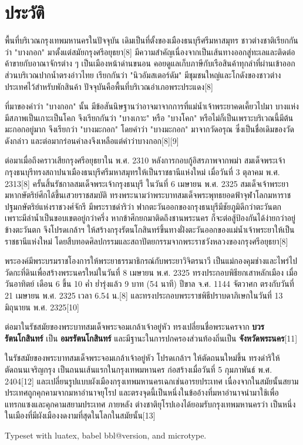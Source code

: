 \documentclass[twocolumn]{article}
\begin{document}
\section{ประวัติ}

พื้นที่บริเวณกรุงเทพมหานครในปัจจุบัน เดิมเป็นที่ตั้งของเมืองธนบุรีศรีมหาสมุทร ชาวต่างชาติเรียกกันว่า "บางกอก" มาตั้งแต่สมัยกรุงศรีอยุธยา[8] มีความสำคัญเนื่องจากเป็นเส้นทางออกสู่ทะเลและติดต่อค้าขายกับอาณาจักรต่าง ๆ เป็นเมืองหน้าด่านขนอน คอยดูแลเก็บภาษีกับเรือสินค้าทุกลำที่ผ่านเข้าออก ส่วนบริเวณปากน้ำตรงอ่าวไทย เรียกกันว่า "นิวอัมสเตอร์ดัม" มีชุมชนใหญ่และโกดังของชาวต่างประเทศไว้สำหรับพักสินค้า ปัจจุบันคือพื้นที่บริเวณอำเภอพระประแดง[8]

ที่มาของคำว่า "บางกอก" นั้น มีข้อสันนิษฐานว่าอาจมาจากการที่แม่น้ำเจ้าพระยาคดเคี้ยวไปมา บางแห่งมีสภาพเป็นเกาะเป็นโคก จึงเรียกกันว่า "บางเกาะ" หรือ "บางโคก" หรือไม่ก็เป็นเพราะบริเวณนี้มีต้นมะกอกอยู่มาก จึงเรียกว่า "บางมะกอก" โดยคำว่า "บางมะกอก" มาจากวัดอรุณ ซึ่งเป็นชื่อเดิมของวัดดังกล่าว และต่อมากร่อนคำลงจึงเหลือแต่คำว่าบางกอก[8][9]

ต่อมาเมื่อถึงคราวเสียกรุงศรีอยุธยาใน พ.ศ. 2310 หลังการกอบกู้อิสรภาพจากพม่า สมเด็จพระเจ้ากรุงธนบุรีทรงสถาปนาเมืองธนบุรีศรีมหาสมุทรให้เป็นราชธานีแห่งใหม่ เมื่อวันที่ 3 ตุลาคม พ.ศ. 2313[8] ครั้นสิ้นรัชกาลสมเด็จพระเจ้ากรุงธนบุรี ในวันที่ 6 เมษายน พ.ศ. 2325 สมเด็จเจ้าพระยามหากษัตริย์ศึกได้ขึ้นเสวยราชสมบัติ ทรงพระนามว่าพระบาทสมเด็จพระพุทธยอดฟ้าจุฬาโลกมหาราช ปฐมกษัตริย์แห่งราชวงศ์จักรี มีพระราชดำริว่า ฟากตะวันออกของกรุงธนบุรีมีชัยภูมิดีกว่าตะวันตก เพราะมีลำน้ำเป็นขอบเขตอยู่กว่าครึ่ง หากข้าศึกยกมาติดถึงชานพระนคร ก็จะต่อสู้ป้องกันได้ง่ายกว่าอยู่ข้างตะวันตก จึงโปรดเกล้าฯ ให้สร้างกรุงรัตนโกสินทร์ขึ้นทางฝั่งตะวันออกของแม่น้ำเจ้าพระยาให้เป็นราชธานีแห่งใหม่ โดยสืบทอดศิลปกรรมและสถาปัตยกรรมจากพระราชวังหลวงของกรุงศรีอยุธยา[8]

พระองค์มีพระบรมราชโองการให้พระยาธรรมาธิกรณ์กับพระยาวิจิตรนาวี เป็นแม่กองคุมช่างและไพร่ไปวัดกะที่ดินเพื่อสร้างพระนครใหม่ในวันที่ 8 เมษายน พ.ศ. 2325 ทรงประกอบพิธียกเสาหลักเมือง เมื่อวันอาทิตย์ เดือน 6 ขึ้น 10 ค่ำ ย่ำรุ่งแล้ว 9 บาท (54 นาที) ปีขาล จ.ศ. 1144 จัตวาศก ตรงกับวันที่ 21 เมษายน พ.ศ. 2325 เวลา 6.54 น.[8] และทรงประกอบพระราชพิธีปราบดาภิเษกในวันที่ 13 มิถุนายน พ.ศ. 2325[10]

ต่อมาในรัชสมัยของพระบาทสมเด็จพระจอมเกล้าเจ้าอยู่หัว ทรงเปลี่ยนชื่อพระนครจาก \textbf{บวรรัตนโกสินทร์} เป็น \textbf{อมรรัตนโกสินทร์} และมีฐานะในการปกครองส่วนท้องถิ่นเป็น \textbf{จังหวัดพระนคร}[11]

ในรัชสมัยของพระบาทสมเด็จพระจอมเกล้าเจ้าอยู่หัว โปรดเกล้าฯ ให้ตัดถนนใหม่ขึ้น ทรงดำริให้ตัดถนนเจริญกรุง เป็นถนนเส้นแรกในกรุงเทพมหานคร ก่อสร้างเมื่อวันที่ 5 กุมภาพันธ์ พ.ศ. 2404[12] และเปลี่ยนรูปแบบผังเมืองกรุงเทพมหานครเฉกเช่นอารยประเทศ เนื่องจากในสมัยนั้นสยามประเทศถูกคุกคามจากมหาอำนาจยุโรป และตรงจุดนี้เป็นหนึ่งในข้ออ้างที่มหาอำนาจนำมาใช้เพื่อแทรกแซงและคุกคามสยามประเทศ ภายหลัง ต่างชาติยุโรปเองได้ยอมรับกรุงเทพมหานครว่า เป็นหนึ่งในเมืองที่มีผังเมืองงดงามที่สุดในโลกในสมัยนั้น[13]

\bigskip

Typeset with luatex, babel \csname bbl@version\endcsname, and 
microtype.
\end{document}
